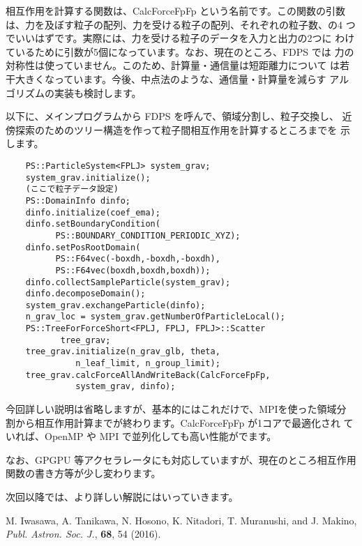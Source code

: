 \documentclass[twocolumn,10pt]{jarticle}
\begin{document}
相互作用を計算する関数は、CalcForceFpFp という名前です。この関数の引数
は、力を及ぼす粒子の配列、力を受ける粒子の配列、それぞれの粒子数、の4
つでいいはずです。実際には、力を受ける粒子のデータを入力と出力の2つに
わけているために引数が5個になっています。なお、現在のところ、FDPS では
力の対称性は使っていません。このため、計算量・通信量は短距離力について
は若干大きくなっています。今後、中点法のような、通信量・計算量を減らす
アルゴリズムの実装も検討します。


以下に、メインプログラムから FDPS を呼んで、領域分割し、粒子交換し、
近傍探索のためのツリー構造を作って粒子間相互作用を計算するところまでを
示します。

{\scriptsize
\begin{verbatim}
    PS::ParticleSystem<FPLJ> system_grav;
    system_grav.initialize();
    (ここで粒子データ設定)
    PS::DomainInfo dinfo;
    dinfo.initialize(coef_ema);
    dinfo.setBoundaryCondition(
          PS::BOUNDARY_CONDITION_PERIODIC_XYZ);
    dinfo.setPosRootDomain(
          PS::F64vec(-boxdh,-boxdh,-boxdh),
          PS::F64vec(boxdh,boxdh,boxdh));
    dinfo.collectSampleParticle(system_grav);
    dinfo.decomposeDomain();
    system_grav.exchangeParticle(dinfo);
    n_grav_loc = system_grav.getNumberOfParticleLocal();
    PS::TreeForForceShort<FPLJ, FPLJ, FPLJ>::Scatter
           tree_grav;
    tree_grav.initialize(n_grav_glb, theta,
              n_leaf_limit, n_group_limit);
    tree_grav.calcForceAllAndWriteBack(CalcForceFpFp,
              system_grav, dinfo);
\end{verbatim}
}
今回詳しい説明は省略しますが、基本的にはこれだけで、MPIを使った領域分
割から相互作用計算までが終わります。CalcForceFpFp が1コアで最適化され
ていれば、OpenMP や MPI で並列化しても高い性能がでます。

なお、GPGPU 等アクセラレータにも対応していますが、現在のところ相互作用
関数の書き方等が少し変わります。

次回以降では、より詳しい解説にはいっていきます。







\begin{thebibliography}{9}
M. {Iwasawa},  A.  {Tanikawa}, N.  {Hosono}, K. {Nitadori},
T. {Muranushi}, and J. {Makino},
\textit{Publ. Astron. Soc. J.}, {\bf 68}, 54 (2016).
\end{thebibliography}


\profile
\end{document}
